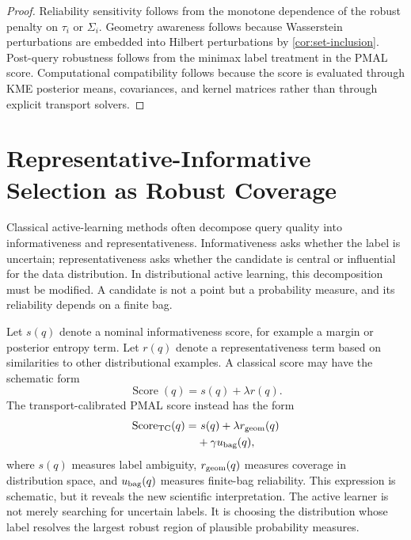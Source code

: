 \documentclass[10pt,journal]{IEEEtran}
\begin{document}
\begin{proof}
Reliability sensitivity follows from the monotone dependence of the robust penalty on $\tau_i$ or $\Sigma_i$. Geometry awareness follows because Wasserstein perturbations are embedded into Hilbert perturbations by \cref{cor:set-inclusion}. Post-query robustness follows from the minimax label treatment in the PMAL score. Computational compatibility follows because the score is evaluated through KME posterior means, covariances, and kernel matrices rather than through explicit transport solvers.
\end{proof}

\section{Representative-Informative Selection as Robust Coverage}
\label{sec:coverage}

Classical active-learning methods often decompose query quality into informativeness and representativeness. Informativeness asks whether the label is uncertain; representativeness asks whether the candidate is central or influential for the data distribution. In distributional active learning, this decomposition must be modified. A candidate is not a point but a probability measure, and its reliability depends on a finite bag.

Let $s(q)$ denote a nominal informativeness score, for example a margin or posterior entropy term. Let $r(q)$ denote a representativeness term based on similarities to other distributional examples. A classical score may have the schematic form
\begin{equation}
    \operatorname{Score}(q)=s(q)+\lambda r(q).
\end{equation}
The transport-calibrated PMAL score instead has the form
\begin{equation}
\begin{aligned}
\operatorname{Score}_{\rm TC}(q)
=&\ s(q)
+\lambda r_{\rm geom}(q)\\
&+\gamma u_{\rm bag}(q),
\end{aligned}
\end{equation}
where $s(q)$ measures label ambiguity, $r_{\rm geom}(q)$ measures coverage in distribution space, and $u_{\rm bag}(q)$ measures finite-bag reliability.
This expression is schematic, but it reveals the new scientific interpretation. The active learner is not merely searching for uncertain labels. It is choosing the distribution whose label resolves the largest robust region of plausible probability measures.
\end{document}
